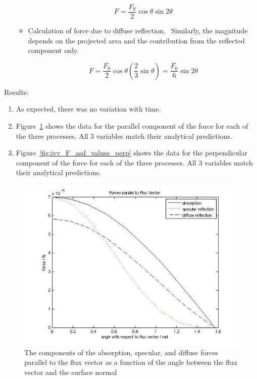 \begin{description}
\begin{enumerate}
\begin{itemize}
         \begin{equation}
           F=\frac{F_{0}}{2}\cos \theta \sin 2\theta
         \end{equation}

        \item{Calculation of force due to diffuse reflection.}\ \newline
          Similarly, the magnitude depends on the projected area
          and the contribution from the reflected component only.

          \begin{equation}
            F=\frac{F_{0}}{2}\cos \theta \left(\frac{2}{3}\sin \theta
              \right)=\frac{F_{0}}{6}\sin 2\theta
          \end{equation}
      \end{itemize}
    \end{enumerate}
  \item{Results:}\newline
    \begin{enumerate}
      \item{} As expected, there was no variation with time.
      \item{}
        Figure~\ref{fig:ivv_F_asd_values_par} shows
        the data for the parallel component of the force for each of the three
        processes.  All 3 variables match their analytical predictions.
      \item{}
        Figure~\ref{fig:ivv_F_asd_values_perp} shows
        the data for the perpendicular component of the force for each of the
        three processes.  All 3 variables match their analytical predictions.
    \end{enumerate}
    \begin{figure}[!ht]
        \includegraphics[width=180mm]{figs/Fsda/forces_parallel.jpg}
        \caption{The components of the absorption, specular, and diffuse forces
        parallel to the flux vector as a function of the angle between the flux
        vector and the surface normal}
        \label{fig:ivv_F_asd_values_par}
    \end{figure}


\end{description}
